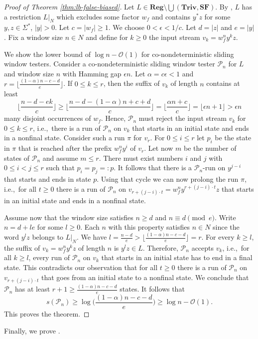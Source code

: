 \documentclass{article}\usepackage[a4paper,margin=20mm]{geometry}
\renewcommand{\O}{\mathcal{O}}
\renewcommand{\P}{\mathcal{P}}
\newcommand{\Reg}{\mathbf{Reg}}
\newcommand{\Triv}{\mathbf{Triv}}
\newcommand{\SF}{\mathbf{SF}}
\renewcommand{\geq}{\geqslant}
\renewcommand{\leq}{\leqslant}
\renewcommand{\ge}{\geq}
\renewcommand{\le}{\leq}
\begin{document}
\begin{proof}[Proof of Theorem \ref{thm:lb-false-biased}]
Let $L \in \Reg \setminus \bigcup(\Triv, \SF)$.
By , $L$ has a restriction $L|_N$ which excludes some factor $w_f$
and contains $y^*z$ for some $y,z \in \Sigma^*$, $|y| > 0$.
Let $c = |w_f| \geq 1$. We choose $0 < \epsilon < 1/c$.
Let $d = |z|$ and $e = |y|$.
Fix a window size $n\in N$ and 
define for $k \geq 0$ the input stream 
$v_k = w_f^n y^k z$.

We show the  lower bound of $\log n - \O(1)$  for co-nondeterministic sliding window testers.
Consider a co-nondeterministic sliding window tester $\P_n$ for $L$ and window size $n$ with Hamming gap $\epsilon n$.
Let $\alpha = c \epsilon < 1$ and $r= \lfloor \frac{(1-\alpha) n - c - d}{e} \rfloor$.
If $0 \le k \le r$, then the suffix of $v_k$ of length $n$  contains at least
\[
\bigg\lfloor\frac{n - d - e k}{c} \bigg\rfloor \geq 
\bigg\lfloor\frac{n - d - (1-\alpha) n + c + d}{c} \bigg\rfloor = 
\bigg\lfloor\frac{\alpha n + c}{c} \bigg\rfloor = \lfloor \epsilon n + 1 \rfloor  > \epsilon n
\]
many disjoint occurrences of $w_f$.
Hence, $\P_n$ must reject the input stream $v_k$ for $0 \le k \le r$,
i.e.,~there is a run of $\P_n$ on $v_k$ 
that starts in an initial state and ends in a nonfinal state.
Consider such a run $\pi$ for $v_r$.
For $0 \leq i \leq r$ let $p_i$ be the state in $\pi$ that is reached after the prefix $w_f^n y^i$ of $v_r$.
Let now $m$ be the number of states of $\P_n$ and assume $m\le r$.
There must exist numbers $i$ and $j$ with $0 \leq i < j \leq r$
such that $p_i = p_j =: p$.
It follows that there is a $\P_n$-run on $y^{j-i}$ that starts and ends in state $p$.
Using that cycle we can now prolong the run $\pi$,
i.e.,~for all $t\ge 0$ there is a run of $\P_n$ on $v_{r+(j-i)\cdot t}=w_f^n y^{r+(j-i)\cdot t}z$ 
that starts in an initial state and ends in a nonfinal state.

Assume now that the window size satisfies $n \geq d$ and $n \equiv d \pmod e$. Write $n = d + l e$ for some $l \geq 0$.
Each $n$ with this property satisfies $n\in N$ since the word $y^lz$ belongs to $L|_N$.
We have $l  = \frac{n-d}{e} > \lfloor \frac{(1-\alpha) n - c - d}{e} \rfloor = r$. For every $k \ge l$,
the suffix of $v_k = w_f^n y^k z$ of length $n$ is $y^l z \in L$.
Therefore, $\P_n$ accepts $v_k$, i.e.,~for all $k\ge l$,
every run of $\P_n$ on $v_k$ that starts in an initial state has to end in a final state.
This contradicts our observation that for all $t\ge 0$ there is a run of $\P_n$ on $v_{r+(j-i)\cdot t}$ that goes from an initial state to a 
nonfinal state. We conclude that $\P_n$ has at least $r+1 \geq \frac{(1-\alpha) n - c - d}{e}$ states.
It follows that 
\[
s(\P_n) \geq  \log \bigg( \frac{(1-\alpha) n - c - d}{e} \bigg) \geq \log n - \O(1).
\]
This proves the theorem.
\end{proof}
Finally, we prove .
\end{document}
